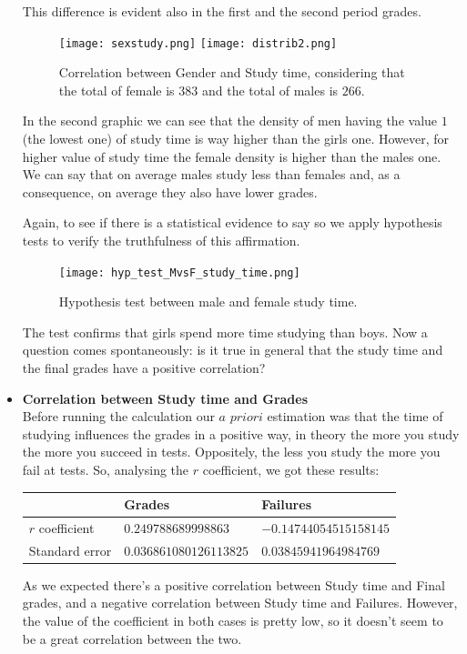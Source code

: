 \documentclass[a4paper, 11pt]{article}
\theoremstyle{definition}
\numberwithin{equation}{section}		%
\numberwithin{table}{section}				%
\begin{document}
\begin{itemize}
This difference is evident also in the first and the second period grades.

\begin{figure}[h]\centering
\texttt{[image: sexstudy.png]}
\texttt{[image: distrib2.png]}
\caption{Correlation between Gender and Study time, considering that the total of female is $383$ and the total of males is $266$.}
\end{figure}

In the second graphic we can see that the density of men having the value $1$ (the lowest one) of study time is way higher than the girls one. However, for higher value of study time the female density is higher than the males one. We can say that on average males study less than females and, as a consequence, on average they also have lower grades.

Again, to see if there is a statistical evidence to say so we apply
hypothesis tests to verify the truthfulness of this affirmation.

\begin{figure}[h]\centering
\texttt{[image: hyp\_test\_MvsF\_study\_time.png]}
\caption{Hypothesis test between male and female study time.}
\end{figure}

The test confirms that girls spend more time studying than boys.
Now a question comes spontaneously: is it true in general that the study time and the final grades have a positive correlation?

\item \textbf{Correlation between Study time and Grades}
\\Before running the calculation our $a$ $priori$ estimation was that the time of studying influences the grades in a positive way, in theory the more you study the more you succeed in tests. Oppositely, the less you study the more you fail at tests. So, analysing the $r$ coefficient, we got these results:
\begin{center}
\begin{tabular}{|p{3cm}|p{4cm}|p{4cm}|}
\hline
 & Grades & Failures\\
\hline
$r$ coefficient & $0.249788689998863$ & $-0.14744054515158145$\\
\hline
Standard error & $0.036861080126113825$ & $0.03845941964984769$\\
\hline
\end{tabular}
\end{center}

As we expected there's a positive correlation between Study time and Final grades, and a negative correlation between Study time and Failures. However, the value of the coefficient in both cases is pretty low, so it doesn't seem to be a great correlation between the two. 


\end{itemize}
\end{document}
